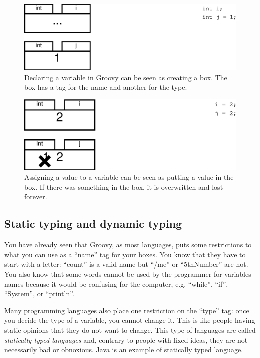 \begin{figure}[hbtp]
  \centering
  \includegraphics[width=\textwidth]{gfx/variables1}
  \caption{Declaring a variable in Groovy can be seen as creating a
    box. The box has a tag for the name and another for the type.}
  \label{fig:var1}
\end{figure}

\begin{figure}[hbtp]
  \centering
  \includegraphics[width=\textwidth]{gfx/variables2}
  \caption{Assigning a value to a variable can be seen as putting a
    value in the box. If there was something in the box, it is
    overwritten and lost forever.}
  \label{fig:var2}
\end{figure}

\subsection{Static typing and dynamic typing}
\label{sec:strong-typing-weak}

You have already seen that Groovy, as most languages, puts some
restrictions to what you can use as a ``name'' tag for your boxes. You
know that they have to start with a letter: ``count'' is a valid name
but ``/me'' or ``5thNumber'' are not. You also know that some words
cannot be used by the programmer for variables names because it would
be confusing for the computer, e.g. ``while'', ``if'', ``System'', or
``println''. 

Many programming languages also place one restriction on the ``type''
tag: once you decide the type of a variable, you cannot change
it. This is like people having static opinions that they do not want
to change. This type of languages are called \emph{statically typed
  languages} and, contrary to people with fixed ideas, they are
not necessarily bad or obnoxious. Java is an example of
statically typed language. 

